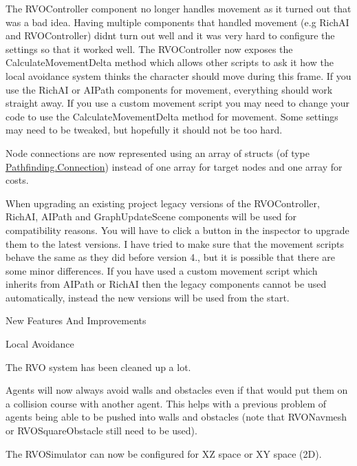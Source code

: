 \begin{DoxyItemize}
\begin{DoxyItemize}
\begin{DoxyItemize}
\item The R\+V\+O\+Controller component no longer handles movement as it turned out that was a bad idea. Having multiple components that handled movement (e.\+g Rich\+AI and R\+V\+O\+Controller) didn\textquotesingle{}t turn out well and it was very hard to configure the settings so that it worked well. The R\+V\+O\+Controller now exposes the Calculate\+Movement\+Delta method which allows other scripts to ask it how the local avoidance system thinks the character should move during this frame. If you use the Rich\+AI or A\+I\+Path components for movement, everything should work straight away. If you use a custom movement script you may need to change your code to use the Calculate\+Movement\+Delta method for movement. Some settings may need to be tweaked, but hopefully it should not be too hard.
\item Node connections are now represented using an array of structs (of type \mbox{\hyperlink{struct_pathfinding_1_1_connection}{Pathfinding.\+Connection}}) instead of one array for target nodes and one array for costs.
\item When upgrading an existing project legacy versions of the R\+V\+O\+Controller, Rich\+AI, A\+I\+Path and Graph\+Update\+Scene components will be used for compatibility reasons. You will have to click a button in the inspector to upgrade them to the latest versions. I have tried to make sure that the movement scripts behave the same as they did before version 4., but it is possible that there are some minor differences. If you have used a custom movement script which inherits from A\+I\+Path or Rich\+AI then the legacy components cannot be used automatically, instead the new versions will be used from the start.
\end{DoxyItemize}
\item New Features And Improvements
\begin{DoxyItemize}
\item Local Avoidance
\begin{DoxyItemize}
\item The R\+VO system has been cleaned up a lot.
\begin{DoxyItemize}
\item Agents will now always avoid walls and obstacles even if that would put them on a collision course with another agent. This helps with a previous problem of agents being able to be pushed into walls and obstacles (note that R\+V\+O\+Navmesh or R\+V\+O\+Square\+Obstacle still need to be used).
\item The R\+V\+O\+Simulator can now be configured for XZ space or XY space (2D).

\end{DoxyItemize}
\end{DoxyItemize}
\end{DoxyItemize}
\end{DoxyItemize}
\end{DoxyItemize}
